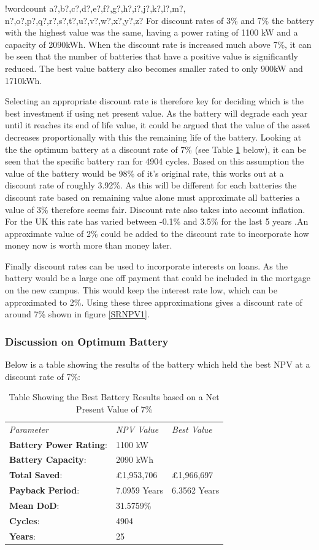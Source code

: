 \documentclass[fontsize=9.5pt]{extarticle}
\numberwithin{figure}{section} %
\newcounter{words}
\newenvironment{counted}{%
  \setcounter{words}{0}
  \SearchList!{wordcount}{\stepcounter{words}}
    {a?,b?,c?,d?,e?,f?,g?,h?,i?,j?,k?,l?,m?,
    n?,o?,p?,q?,r?,s?,t?,u?,v?,w?,x?,y?,z?}
  \UndoBoundary{'}
  \SearchOrder{p;}}{%
  \StopSearching}
\begin{document}
\begin{counted}
For discount rates of 3\% and 7\% the battery with the highest value was
the same, having a power rating of 1100 kW and a capacity of 2090kWh.
When the discount rate is increased much above 7\%, it can be seen that
the number of batteries that have a positive value is significantly
reduced. The best value battery also becomes smaller rated to only 900kW
and 1710kWh.

Selecting an appropriate discount rate is therefore key for deciding
which is the best investment if using net present value. As the battery
will degrade each year until it reaches its end of life value, it could
be argued that the value of the asset decreases proportionally with this
the remaining life of the battery. Looking at the the optimum battery at
a discount rate of 7\% (see Table \ref{BestNPVTable} below), it can be
seen that the specific battery ran for 4904 cycles. Based on this
assumption the value of the battery would be 98\% of it's original rate,
this works out at a discount rate of roughly 3.92\%. As this will be
different for each batteries the discount rate based on remaining value
alone must approximate all batteries a value of 3\% therefore seems
fair. Discount rate also takes into account inflation. For the UK this
rate has varied between -0.1\% and 3.5\% for the last 5 years
\cite{UnitedKi95:online}.An approximate value of 2\% could be added to
the discount rate to incorporate how money now is worth more than money
later.

Finally discount rates can be used to incorporate interests on loans. As
the battery would be a large one off payment that could be included in
the mortgage on the new campus. This would keep the interest rate low,
which can be approximated to 2\%. Using these three approximations gives
a discount rate of around 7\% shown in figure \ref{SRNPV1}.

\subsubsection{Discussion on Optimum
Battery}\label{discussion-on-optimum-battery}

Below is a table showing the results of the battery which held the best
NPV at a discount rate of 7\%:

\begin{table}[H]
\begin{tabular}{p{3.4cm}p{3cm}p{3cm}}
\textit{Parameter} & \textit{NPV Value} & \textit{Best Value}\\
\textbf{Battery Power Rating}:& 1100 kW\\
\textbf{Battery Capacity}:& 2090 kWh\\
\textbf{Total Saved}:& £1,953,706 & £1,966,697\\
\textbf{Payback Period}:& 7.0959 Years & 6.3562 Years\\
\textbf{Mean DoD}:& 31.5759\% \\
\textbf{Cycles}:& 4904\\
\textbf{Years}:& 25\\
\end{tabular}
\label{BestNPVTable}
\caption{Table Showing the Best Battery Results based on a Net Present Value of 7\%}
\end{table}


\end{counted}
\end{document}
